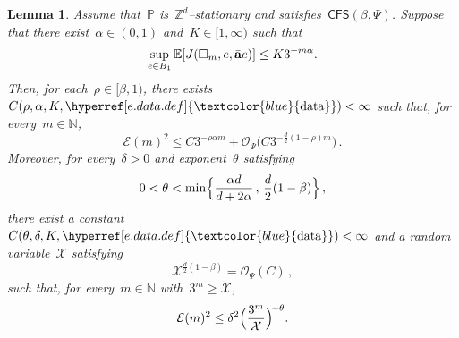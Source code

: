 \documentclass[11pt,twoside]{article} %
\let\oldsquare\square %
\renewcommand{\square}{\oldsquare}
\numberwithin{equation}{section}
\newtheorem{lemma}[theorem]{Lemma}
\theoremstyle{definition}
\newcommand{\dataref}{\hyperref[e.data.def]{\textcolor{blue}{\ensuremath{\mathrm{data}}}}}
\let\originalleft\left
\let\originalright\right
\renewcommand{\left}{\mathopen{}\mathclose\bgroup\originalleft}
\renewcommand{\right}{\aftergroup\egroup\originalright}
\newcommand*{\N}{\ensuremath{\mathbb{N}}}
\newcommand*{\Zd}{\ensuremath{\mathbb{Z}^d}}
\renewcommand{\a}{\mathbf{a}}
\newcommand{\ahom}{\bar{\a}}
\newcommand{\cu}{\square}
\renewcommand{\P}{\mathbb{P}}
\newcommand{\E}{\mathbb{E}}
\newcommand{\X}{\mathcal{X}}
\renewcommand{\O}{\mathcal{O}}
\newcommand{\CFS}{\mathsf{CFS}}
\begin{document}
\begin{lemma}
\label{l.mathcalE.minscale}
Assume that~$\P$ is~$\Zd$--stationary and satisfies~$\CFS(\beta,\Psi)$. 
Suppose that there exist~$\alpha \in (0,1)$ and~$K\in[1,\infty)$ such that 
\begin{align}
\label{e.EJtozero.rate.ass}
\sup_{e\in B_1}
\E \left[ J(\cu_m,e,\ahom e) \right] 
\leq 
K 3^{-m\alpha}. 
\end{align}
Then, for each~$\rho \in [\beta , 1)$, there exists~$C(\rho,\alpha,K,\dataref)<\infty$ such that, for every~$m\in\N$, 
\begin{equation}
\label{e.Em.summedout.pre}
\mathcal{E}(m)^2
\leq 
C3^{-\rho \alpha m } + \O_\Psi\bigl( C 3^{-\frac d2(1-\rho)m} \bigr) \,.
\end{equation}
Moreover, for every~$\delta>0$ and exponent~$\theta$ satisfying 
\begin{equation}
\label{e.theta.restriction}
0 < \theta < 
\min \Bigl\{ 
\frac{\alpha d}{d+2\alpha} 
\,,\, 
\frac d2(1-\beta) 
\Bigr\}\,,
\end{equation}
there exist a constant~$C(\theta,\delta,K,\dataref)<\infty$ and a random variable~$\X$ satisfying 
\begin{equation}
\label{e.minscaleint}
\X^{\frac d2 (1-\beta)}
=
\O_{\Psi}(C)\,,
\end{equation}
such that, for every~$m \in \N$ with~$3^m\geq \X$,
\begin{equation}
\label{e.convssmaxsmax}
\mathcal{E}(m) ^2
\leq
\delta^2 
\Bigl( \frac{3^m}{\X} \Bigr)^{\!-\theta}.
\end{equation}
\end{lemma}
\end{document}
